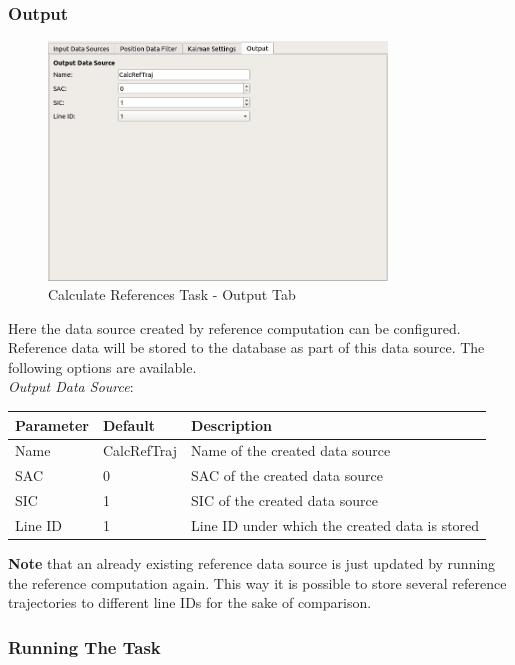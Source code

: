 \subsubsection{Output}

\begin{figure}[H]
    \center
      \includegraphics[width=9cm]{figures/ui_task_references_tab_info.png}
    \caption{Calculate References Task - Output Tab}
\end{figure}

Here the data source created by reference computation can be configured. 
Reference data will be stored to the database as part of this data source.
The following options are available. \\

\textit{Output Data Source}:
\begin{table}[H]
    \center
    \begin{tabularx}{\textwidth}{ | l | l | X |}
        \hline
        \textbf{Parameter} & \textbf{Default} & \textbf{Description} \\ \hline
        Name & CalcRefTraj & Name of the created data source \\ \hline
        SAC & 0 & SAC of the created data source \\ \hline
        SIC & 1 & SIC of the created data source \\ \hline
        Line ID & 1 & Line ID under which the created data is stored \\ \hline
    \end{tabularx}
\end{table}

\textbf{Note} that an already existing reference data source is just updated by running the 
reference computation again. This way it is possible to store several reference trajectories to 
different line IDs for the sake of comparison.

\subsubsection{Running The Task}


